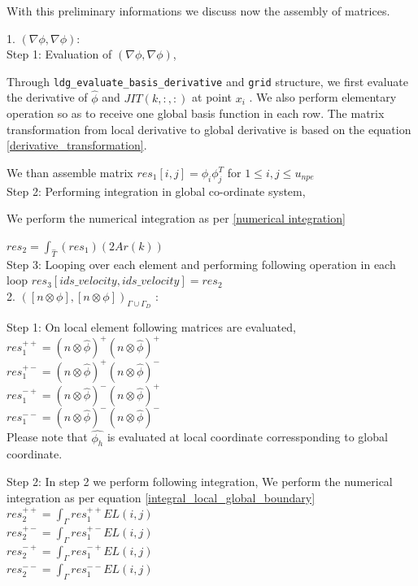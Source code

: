 \documentclass[a4paper]{book}
\begin{document}
With this preliminary informations we discuss now the assembly of matrices.

1. $(\nabla \phi, \nabla \phi)$:\\

Step 1: Evaluation of $(\nabla \phi , \nabla \phi)$,

Through \verb|ldg_evaluate_basis_derivative| and \verb|grid| structure, we first evaluate the derivative of $\hat{\phi}$ and $JIT(k,:,:)$ at point $x_i$ . We also perform elementary operation so as to receive one global basis function in each row. The matrix transformation from local derivative to global derivative is based on the equation \ref{derivative_transformation}.

We than assemble matrix $res_1[i,j]=\phi_i \phi_j^T$ for $1 \leq i,j \leq u_{npe}$\\

Step 2: Performing integration in global co-ordinate system,

We perform the numerical integration as per \ref{numerical integration} 

$res_2 = \int_{\hat{T}} (res_1) (2 Ar(k))$\\

Step 3: Looping over each element and performing following operation in each loop $res_3[ids\_velocity,ids\_velocity]=res_2$\\


2. $([n \otimes \phi], [n \otimes \phi])_{\Gamma \cup \Gamma_D}$ :

Step 1: On local element following matrices are evaluated,\\

$res_1^{++} = (n \otimes \hat{\phi})^+ (n \otimes \hat{\phi})^+$\\
$res_1^{+-} = (n \otimes \hat{\phi})^+ (n \otimes \hat{\phi})^-$\\
$res_1^{-+} = (n \otimes \hat{\phi})^- (n \otimes \hat{\phi})^+$\\
$res_1^{--} = (n \otimes \hat{\phi})^- (n \otimes \hat{\phi})^-$\\

Please note that $\hat{\phi_h}$ is evaluated at local coordinate corressponding to global coordinate.

Step 2: In step 2 we perform following integration, 
We perform the numerical integration as per equation \ref{integral_local_global_boundary}
\\ 
$res_2^{++} = \int_{\Gamma} res_1^{++} EL(i,j)$\\
$res_2^{+-} = \int_{\Gamma} res_1^{+-} EL(i,j)$\\
$res_2^{-+} = \int_{\Gamma} res_1^{-+} EL(i,j)$\\
$res_2^{--} = \int_{\Gamma} res_1^{--} EL(i,j)$\\
\end{document}
